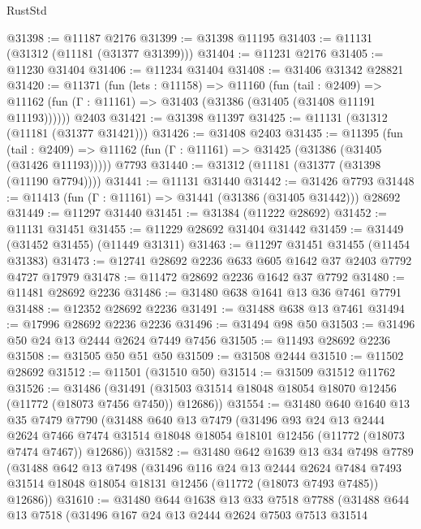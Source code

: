 \begin{lexlean}{RustStd}
\begin{coremodule}
@31398 := @11187 @2176
@31399 := @31398 @11195
@31403 := @11131 (@31312 (@11181 (@31377 @31399)))
@31404 := @11231 @2176
@31405 := @11230 @31404
@31406 := @11234 @31404
@31408 := @31406 @31342 @28821
@31420 := @11371
    (fun (lets : @11158) =>
    @11160
      (fun (tail : @2409) =>
      @11162 (fun (Γ : @11161) => @31403 (@31386 (@31405 (@31408 @11191 @11193))))))
    @2403
@31421 := @31398 @11397
@31425 := @11131 (@31312 (@11181 (@31377 @31421)))
@31426 := @31408 @2403
@31435 := @11395
    (fun (tail : @2409) => @11162 (fun (Γ : @11161) => @31425 (@31386 (@31405 (@31426 @11193)))))
    @7793
@31440 := @31312 (@11181 (@31377 (@31398 (@11190 @7794))))
@31441 := @11131 @31440
@31442 := @31426 @7793
@31448 := @11413 (fun (Γ : @11161) => @31441 (@31386 (@31405 @31442))) @28692
@31449 := @11297 @31440
@31451 := @31384 (@11222 @28692)
@31452 := @11131 @31451
@31455 := @11229 @28692 @31404 @31442
@31459 := @31449 (@31452 @31455) (@11449 @31311)
@31463 := @11297 @31451 @31455 (@11454 @31383)
@31473 := @12741 @28692 @2236 @633 @605 @1642 @37 @2403 @7792 @4727 @17979
@31478 := @11472 @28692 @2236 @1642 @37 @7792
@31480 := @11481 @28692 @2236
@31486 := @31480 @638 @1641 @13 @36 @7461 @7791
@31488 := @12352 @28692 @2236
@31491 := @31488 @638 @13 @7461
@31494 := @17996 @28692 @2236 @2236
@31496 := @31494 @98 @50
@31503 := @31496 @50 @24 @13 @2444 @2624 @7449 @7456
@31505 := @11493 @28692 @2236
@31508 := @31505 @50 @51 @50
@31509 := @31508 @2444
@31510 := @11502 @28692
@31512 := @11501 (@31510 @50)
@31514 := @31509 @31512 @11762
@31526 := @31486
    (@31491 (@31503 @31514 @18048 @18054 @18070 @12456 (@11772 (@18073 @7456 @7450)) @12686))
@31554 := @31480
    @640
    @1640
    @13
    @35
    @7479
    @7790
    (@31488
      @640
      @13
      @7479
      (@31496
        @93
        @24
        @13
        @2444
        @2624
        @7466
        @7474
        @31514
        @18048
        @18054
        @18101
        @12456
        (@11772 (@18073 @7474 @7467))
        @12686))
@31582 := @31480
    @642
    @1639
    @13
    @34
    @7498
    @7789
    (@31488
      @642
      @13
      @7498
      (@31496
        @116
        @24
        @13
        @2444
        @2624
        @7484
        @7493
        @31514
        @18048
        @18054
        @18131
        @12456
        (@11772 (@18073 @7493 @7485))
        @12686))
@31610 := @31480
    @644
    @1638
    @13
    @33
    @7518
    @7788
    (@31488
      @644
      @13
      @7518
      (@31496
        @167
        @24
        @13
        @2444
        @2624
        @7503
        @7513
        @31514

\end{coremodule}
\end{lexlean}
